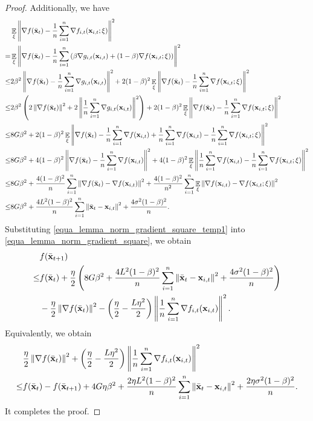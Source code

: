 \documentclass{article}
\begin{document}
\begin{proof}
Additionally, we have
\begin{align}
\nonumber
& \mathop{\mathbb{E}}_{\xi}\left\lVert\nabla f(\bar{{\bf x}}_t) -\frac{1}{n}\sum_{i=1}^n \nabla f_{i,t}({\bf x}_{i,t};\xi)\right\rVert^2 \\ \nonumber
= & \mathop{\mathbb{E}}_{\xi}\left\lVert\nabla f(\bar{{\bf x}}_t) -\frac{1}{n}\sum_{i=1}^n \left( \beta \nabla g_{i,t}({\bf x}_{i,t}) + (1-\beta) \nabla f({\bf x}_{i,t};\xi)  \right)\right\rVert^2 \\ \nonumber
\le & 2\beta^2 \left\lVert\nabla f(\bar{{\bf x}}_t) -\frac{1}{n}\sum_{i=1}^n \nabla g_{i,t}({\bf x}_{i,t})  \right\rVert^2 + 2(1-\beta)^2 \mathop{\mathbb{E}}_{\xi}\left\lVert \nabla f(\bar{{\bf x}}_t) - \frac{1}{n}\sum_{i=1}^n \nabla f({\bf x}_{i,t};\xi) \right\rVert^2\\ \nonumber
\le & 2\beta^2\left( 2\left\lVert\nabla f(\bar{{\bf x}}_t)\right\rVert^2 + 2\left\lVert\frac{1}{n}\sum_{i=1}^n \nabla g_{i,t}({\bf x}_{i,t})  \right\rVert^2 \right) + 2(1-\beta)^2 \mathop{\mathbb{E}}_{\xi}\left\lVert \nabla f(\bar{{\bf x}}_t) - \frac{1}{n}\sum_{i=1}^n \nabla f({\bf x}_{i,t};\xi) \right\rVert^2\\ \nonumber
\le & 8G\beta^2 + 2(1-\beta)^2 \mathop{\mathbb{E}}_{\xi}\left\lVert \nabla f(\bar{{\bf x}}_t) - \frac{1}{n}\sum_{i=1}^n \nabla f({\bf x}_{i,t}) + \frac{1}{n}\sum_{i=1}^n \nabla f({\bf x}_{i,t}) - \frac{1}{n}\sum_{i=1}^n \nabla f({\bf x}_{i,t};\xi) \right\rVert^2\\ \nonumber
\le & 8G\beta^2 + 4(1-\beta)^2 \left\lVert \nabla f(\bar{{\bf x}}_t) - \frac{1}{n}\sum_{i=1}^n \nabla f({\bf x}_{i,t})\right\rVert^2 + 4(1-\beta)^2 \mathop{\mathbb{E}}_{\xi}\left\lVert\frac{1}{n}\sum_{i=1}^n \nabla f({\bf x}_{i,t}) - \frac{1}{n}\sum_{i=1}^n \nabla f({\bf x}_{i,t};\xi) \right\rVert^2\\ \nonumber
\le & 8G\beta^2 +  \frac{4(1-\beta)^2}{n}\sum_{i=1}^n\left\lVert \nabla f(\bar{{\bf x}}_t) -  \nabla f({\bf x}_{i,t}) \right\rVert^2 + \frac{4(1-\beta)^2}{n^2}\sum_{i=1}^n \mathop{\mathbb{E}}_{\xi}\left\lVert\nabla f({\bf x}_{i,t}) - \nabla f({\bf x}_{i,t};\xi) \right\rVert^2\\ \label{equa_lemma_norm_gradient_square_temp1}
\le & 8G\beta^2 +  \frac{4L^2(1-\beta)^2}{n}\sum_{i=1}^n\left\lVert\bar{{\bf x}}_t - {\bf x}_{i,t} \right\rVert^2 + \frac{4\sigma^2(1-\beta)^2}{n}.
\end{align}
Substituting \eqref{equa_lemma_norm_gradient_square_temp1} into \eqref{equa_lemma_norm_gradient_square}, we obtain
\begin{align}
\nonumber
& f(\bar{{\bf x}}_{t+1}) \\ \nonumber
\le & f(\bar{{\bf x}}_t) + \frac{\eta}{2}\left( 8G\beta^2 +  \frac{4L^2(1-\beta)^2}{n}\sum_{i=1}^n\left\lVert\bar{{\bf x}}_t - {\bf x}_{i,t} \right\rVert^2 + \frac{4\sigma^2(1-\beta)^2}{n} \right) \\ \nonumber 
& - \frac{\eta}{2}\left\lVert\nabla f(\bar{{\bf x}}_t)\right\rVert^2 - \left( \frac{\eta}{2} - \frac{L\eta^2}{2} \right)\left\lVert\frac{1}{n}\sum_{i=1}^n \nabla f_{i,t}({\bf x}_{i,t})\right\rVert^2.
\end{align} Equivalently, we obtain
\begin{align}
\nonumber
& \frac{\eta}{2}\left\lVert\nabla f(\bar{{\bf x}}_t)\right\rVert^2 + \left( \frac{\eta}{2} - \frac{L\eta^2}{2} \right)\left\lVert\frac{1}{n}\sum_{i=1}^n \nabla f_{i,t}({\bf x}_{i,t})\right\rVert^2 \\ \nonumber 
\le & f(\bar{{\bf x}}_t) - f(\bar{{\bf x}}_{t+1}) + 4G\eta\beta^2 +  \frac{2\eta L^2(1-\beta)^2}{n}\sum_{i=1}^n\left\lVert\bar{{\bf x}}_t - {\bf x}_{i,t} \right\rVert^2 + \frac{2\eta\sigma^2(1-\beta)^2}{n}.
\end{align} It completes the proof.




\end{proof}
\end{document}
